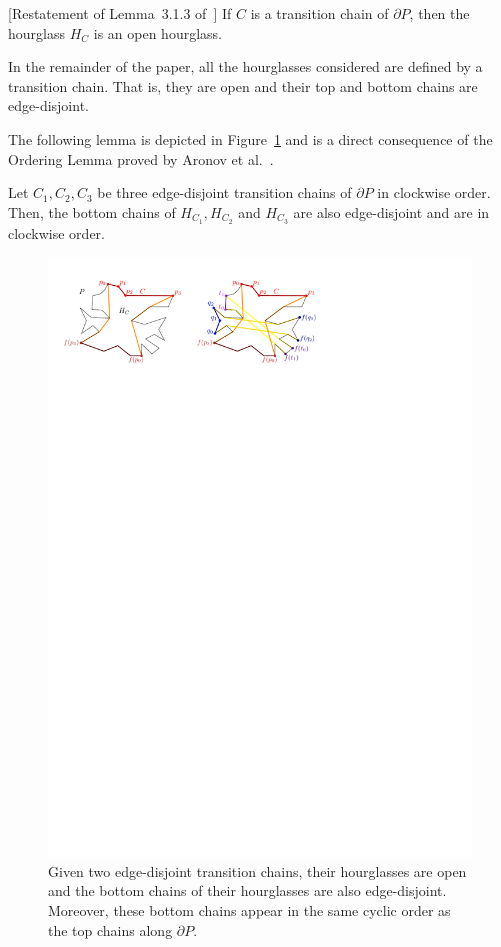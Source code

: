 \documentclass[a4paper,UKenglish]{lipics}
\begin{document}
\begin{lemma}\label{lemma:Transition hourglasses are open}
[Restatement of Lemma~3.1.3 of~\cite{aronov1993furthest}] 
If $C$ is a transition chain of $\partial P$, then the hourglass $H_C$ is an open hourglass.
\end{lemma}

In the remainder of the paper, all the hourglasses considered are defined by a transition chain. That is, they are open and their top and bottom chains are edge-disjoint.

The following lemma is depicted in Figure~\ref{fig:Transition chains and hourglasses} and is a direct consequence of the Ordering Lemma proved by Aronov et al.~\cite[Corollary 2.7.4]{aronov1993furthest}.
\begin{lemma}\label{lemma:Ordering Lemma}
Let $C_1, C_2, C_3$ be three edge-disjoint transition chains of $\partial P$ in clockwise order. Then, the bottom chains of $H_{C_1}, H_{C_2}$ and $H_{C_3}$ are also edge-disjoint and are in clockwise order.
\end{lemma}

\begin{figure}[t]
\centering
\includegraphics{img/TransitionChains.pdf}
\caption{\small Given two edge-disjoint transition chains, their hourglasses are open and
the bottom chains of their hourglasses are also edge-disjoint. 
Moreover, these bottom chains appear in the same cyclic order as the top chains along $\partial P$.}
\label{fig:Transition chains and hourglasses}
\end{figure}
\end{document}
